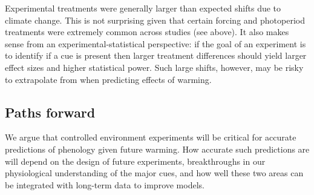 \documentclass[11pt,letter]{article}
\begin{document}
Experimental treatments were generally larger than expected shifts due to climate change. This is not surprising given that certain forcing and photoperiod treatments were extremely common across studies (see above). It also makes sense from an experimental-statistical perspective: if the goal of an experiment is to identify if a cue is present then larger treatment differences should yield larger effect sizes and higher statistical power. Such large shifts, however, may be risky to extrapolate from when predicting effects of warming.   %

\subsection{Paths forward} 
We argue that controlled environment experiments will be critical for accurate predictions of phenology given future warming. How accurate such predictions are will depend on the design of future experiments, breakthroughs in our physiological understanding of the major cues, and how well these two areas can be integrated with long-term data to improve models. \\
\end{document}
